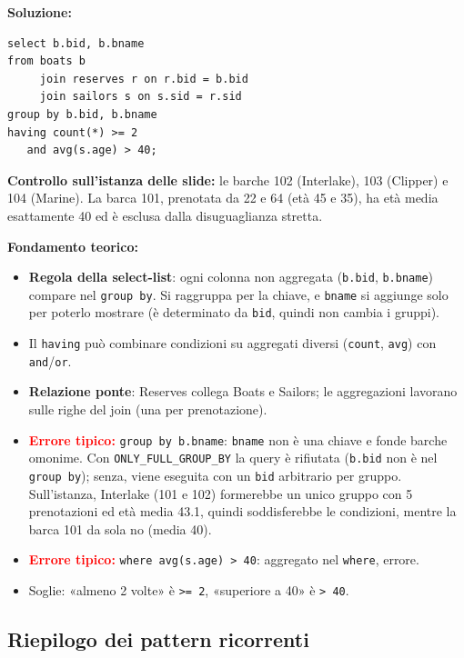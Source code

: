\documentclass[12pt, a4paper]{article}
\begin{document}
\textbf{Soluzione:}
\begin{verbatim}
select b.bid, b.bname
from boats b
     join reserves r on r.bid = b.bid
     join sailors s on s.sid = r.sid
group by b.bid, b.bname
having count(*) >= 2
   and avg(s.age) > 40;
\end{verbatim}
\textbf{Controllo sull'istanza delle slide:} le barche 102 (Interlake), 103 (Clipper) e 104 (Marine). La barca 101, prenotata da 22 e 64 (età 45 e 35), ha età media esattamente 40 ed è esclusa dalla disuguaglianza stretta.

\textbf{Fondamento teorico:}
\begin{itemize}
\item \textbf{Regola della select-list}: ogni colonna non aggregata (\texttt{b.bid}, \texttt{b.bname}) compare nel \texttt{group by}. Si raggruppa per la chiave, e \texttt{bname} si aggiunge solo per poterlo mostrare (è determinato da \texttt{bid}, quindi non cambia i gruppi).
\item Il \texttt{having} può combinare condizioni su aggregati diversi (\texttt{count}, \texttt{avg}) con \texttt{and}/\texttt{or}.
\item \textbf{Relazione ponte}: Reserves collega Boats e Sailors; le aggregazioni lavorano sulle righe del join (una per prenotazione).
\item \textcolor{red}{\textbf{Errore tipico:}} \texttt{group by b.bname}: \texttt{bname} non è una chiave e fonde barche omonime. Con \texttt{ONLY\_FULL\_GROUP\_BY} la query è rifiutata (\texttt{b.bid} non è nel \texttt{group by}); senza, viene eseguita con un \texttt{bid} arbitrario per gruppo. Sull'istanza, Interlake (101 e 102) formerebbe un unico gruppo con 5 prenotazioni ed età media 43.1, quindi soddisferebbe le condizioni, mentre la barca 101 da sola no (media 40).
\item \textcolor{red}{\textbf{Errore tipico:}} \texttt{where avg(s.age) > 40}: aggregato nel \texttt{where}, errore.
\item Soglie: «almeno 2 volte» è \texttt{>= 2}, «superiore a 40» è \texttt{> 40}.
\end{itemize}

\subsection{Riepilogo dei pattern ricorrenti}
\end{document}
